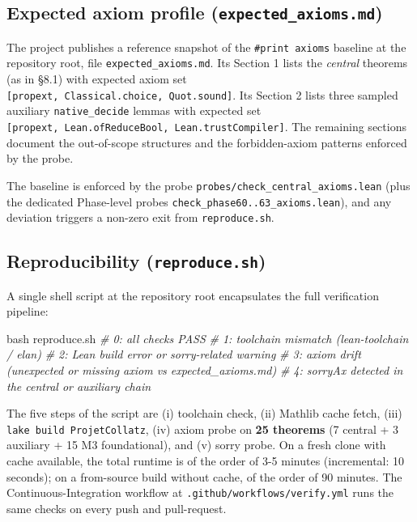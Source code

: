 \documentclass[
  11pt]{amsart}
\newenvironment{Shaded}{}{}
\newcommand{\CommentTok}[1]{\textcolor[rgb]{0.38,0.63,0.69}{\textit{#1}}}
\newcommand{\FunctionTok}[1]{\textcolor[rgb]{0.02,0.16,0.49}{#1}}
\newcommand{\NormalTok}[1]{#1}
\theoremstyle{plain}
\theoremstyle{definition}
\theoremstyle{remark}
\begin{document}
\subsection{\texorpdfstring{Expected axiom profile
(\texttt{expected\_axioms.md})}{Expected axiom profile (expected\_axioms.md)}}\label{expected-axiom-profile-expected_axioms.md}

The project publishes a reference snapshot of the
\texttt{\#print\ axioms} baseline at the repository root, file
\texttt{expected\_axioms.md}. Its Section 1 lists the \emph{central}
theorems (as in §8.1) with expected axiom set
\texttt{{[}propext,\ Classical.choice,\ Quot.sound{]}}. Its Section 2
lists three sampled auxiliary \texttt{native\_decide} lemmas with
expected set
\texttt{{[}propext,\ Lean.ofReduceBool,\ Lean.trustCompiler{]}}. The
remaining sections document the out-of-scope structures and the
forbidden-axiom patterns enforced by the probe.

The baseline is enforced by the probe
\texttt{probes/check\_central\_axioms.lean} (plus the dedicated
Phase-level probes \texttt{check\_phase60..63\_axioms.lean}), and any
deviation triggers a non-zero exit from \texttt{reproduce.sh}.

\subsection{\texorpdfstring{Reproducibility
(\texttt{reproduce.sh})}{Reproducibility (reproduce.sh)}}\label{reproducibility-reproduce.sh}

A single shell script at the repository root encapsulates the full
verification pipeline:

\begin{Shaded}
\begin{Highlighting}[]
\FunctionTok{bash}\NormalTok{ reproduce.sh}
\CommentTok{\# 0: all checks PASS}
\CommentTok{\# 1: toolchain mismatch (lean{-}toolchain / elan)}
\CommentTok{\# 2: Lean build error or sorry{-}related warning}
\CommentTok{\# 3: axiom drift (unexpected or missing axiom vs expected\_axioms.md)}
\CommentTok{\# 4: sorryAx detected in the central or auxiliary chain}
\end{Highlighting}
\end{Shaded}

The five steps of the script are (i) toolchain check, (ii) Mathlib cache
fetch, (iii) \texttt{lake\ build\ ProjetCollatz}, (iv) axiom probe on
\textbf{25 theorems} (7 central + 3 auxiliary + 15 M3 foundational), and
(v) sorry probe. On a fresh clone with cache available, the total
runtime is of the order of 3-5 minutes (incremental: 10 seconds); on a
from-source build without cache, of the order of 90 minutes. The
Continuous-Integration workflow at \texttt{.github/workflows/verify.yml}
runs the same checks on every push and pull-request.
\end{document}
